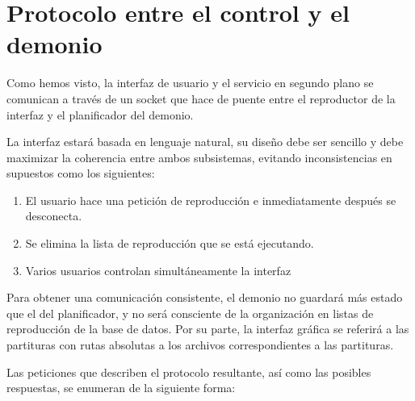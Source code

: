 \section{Protocolo entre el control y el demonio}
\label{sec:protocolo}

Como hemos visto, la interfaz de usuario y el servicio en segundo plano se comunican a través de un socket que hace de puente entre el reproductor de la interfaz y el planificador del demonio.

La interfaz estará basada en lenguaje natural, su diseño debe ser sencillo y debe maximizar la coherencia entre ambos subsistemas, evitando inconsistencias en supuestos como los siguientes:

\begin{enumerate}
	\item El usuario hace una petición de reproducción e inmediatamente después se desconecta.
	\item Se elimina la lista de reproducción que se está ejecutando.
	\item Varios usuarios controlan simultáneamente la interfaz
\end{enumerate}

Para obtener una comunicación consistente, el demonio no guardará más estado que el del planificador, y no será consciente de la organización en listas de reproducción de la base de datos. Por su parte, la interfaz gráfica se referirá a las partituras con rutas absolutas a los archivos correspondientes a las partituras.

Las peticiones que describen el protocolo resultante, así como las posibles respuestas, se enumeran de la siguiente forma:

